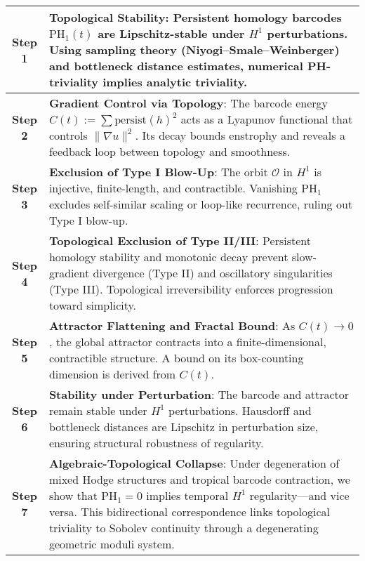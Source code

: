 \documentclass[11pt]{article}
\theoremstyle{definition}
\begin{document}
\begin{center}
\renewcommand{\arraystretch}{1.4}
\begin{tabular}{|c|p{12.5cm}|}
\hline
\textbf{Step 1} & \textbf{Topological Stability}: Persistent homology barcodes $\mathrm{PH}_1(t)$ are Lipschitz-stable under $H^1$ perturbations. Using sampling theory (Niyogi--Smale--Weinberger) and bottleneck distance estimates, numerical PH-triviality implies analytic triviality. \\
\hline
\textbf{Step 2} & \textbf{Gradient Control via Topology}: The barcode energy $C(t) := \sum \mathrm{persist}(h)^2$ acts as a Lyapunov functional that controls $\|\nabla u\|^2$. Its decay bounds enstrophy and reveals a feedback loop between topology and smoothness. \\
\hline
\textbf{Step 3} & \textbf{Exclusion of Type I Blow-Up}: The orbit $\mathcal{O}$ in $H^1$ is injective, finite-length, and contractible. Vanishing $\mathrm{PH}_1$ excludes self-similar scaling or loop-like recurrence, ruling out Type I blow-up. \\
\hline
\textbf{Step 4} & \textbf{Topological Exclusion of Type II/III}: Persistent homology stability and monotonic decay prevent slow-gradient divergence (Type II) and oscillatory singularities (Type III). Topological irreversibility enforces progression toward simplicity. \\
\hline
\textbf{Step 5} & \textbf{Attractor Flattening and Fractal Bound}: As $C(t) \to 0$, the global attractor contracts into a finite-dimensional, contractible structure. A bound on its box-counting dimension is derived from $C(t)$. \\
\hline
\textbf{Step 6} & \textbf{Stability under Perturbation}: The barcode and attractor remain stable under $H^1$ perturbations. Hausdorff and bottleneck distances are Lipschitz in perturbation size, ensuring structural robustness of regularity. \\
\hline
\textbf{Step 7} & \textbf{Algebraic-Topological Collapse}: Under degeneration of mixed Hodge structures and tropical barcode contraction, we show that $\mathrm{PH}_1 = 0$ implies temporal $H^1$ regularity—and vice versa. This bidirectional correspondence links topological triviality to Sobolev continuity through a degenerating geometric moduli system. \\
\hline
\end{tabular}
\end{center}

\end{document}
